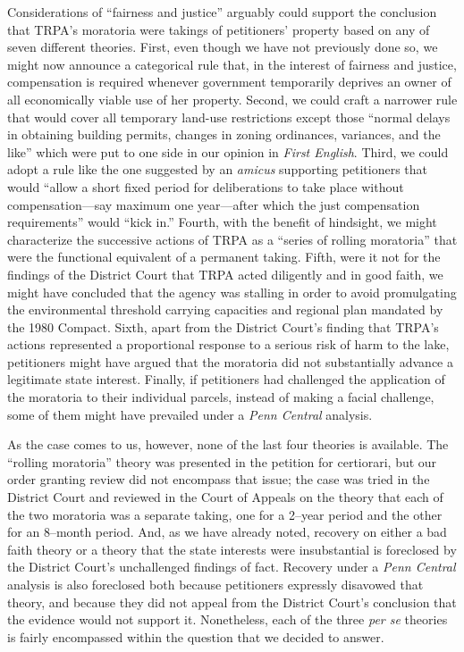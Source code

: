 
Considerations of ``fairness and justice'' arguably could support the conclusion
that TRPA's moratoria were takings of petitioners' property based on any of
seven different theories. First, even though we have not previously done so, we
might now announce a categorical rule that, in the interest of fairness and
justice, compensation is required whenever government temporarily deprives an
owner of all economically viable use of her property. Second, we could craft a
narrower rule that would cover all temporary land-use restrictions except those
``normal delays in obtaining building permits, changes in zoning ordinances,
variances, and the like'' which were put to one side in our opinion in
\textit{First English}. Third, we could adopt a rule like the one suggested by
an \textit{amicus} supporting petitioners that would ``allow a short fixed
period for deliberations to take place without compensation---say maximum one
year---after which the just compensation requirements'' would ``kick in.''
Fourth, with the benefit of hindsight, we might characterize the successive
actions of TRPA as a ``series of rolling moratoria'' that were the functional
equivalent of a permanent taking. Fifth, were it not for the findings of the
District Court that TRPA acted diligently and in good faith, we might have
concluded that the agency was stalling in order to avoid promulgating the
environmental threshold carrying capacities and regional plan mandated by the
1980 Compact. Sixth, apart from the District Court's finding that TRPA's actions
represented a proportional response to a serious risk of harm to the lake,
petitioners might have argued that the moratoria did not substantially advance a
legitimate state interest. Finally, if petitioners had challenged the
application of the moratoria to their individual parcels, instead of making a
facial challenge, some of them might have prevailed under a \textit{Penn
Central} analysis.

As the case comes to us, however, none of the last four theories is available.
The ``rolling moratoria'' theory was presented in the petition for certiorari,
but our order granting review did not encompass that issue; the case was tried
in the District Court and reviewed in the Court of Appeals on the theory that
each of the two moratoria was a separate taking, one for a 2--year period and
the other for an 8--month period. And, as we have already noted, recovery on
either a bad faith theory or a theory that the state interests were
insubstantial is foreclosed by the District Court's unchallenged findings of
fact. Recovery under a \textit{Penn Central} analysis is also foreclosed both
because petitioners expressly disavowed that theory, and because they did not
appeal from the District Court's conclusion that the evidence would not support
it. Nonetheless, each of the three \textit{per se} theories is fairly
encompassed within the question that we decided to answer.

